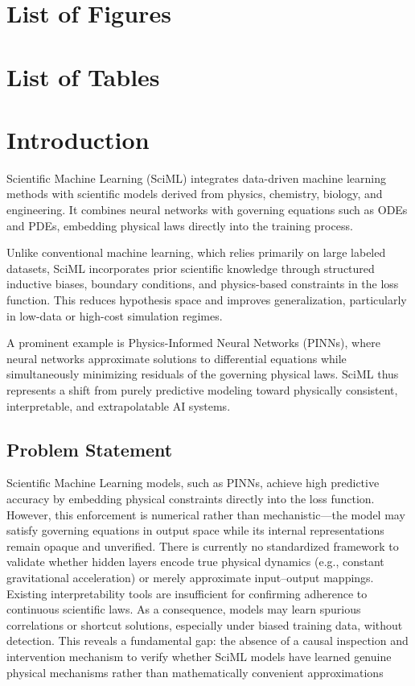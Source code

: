 \documentclass[12pt,singleside,a4paper]{article}
\begin{document}
\section*{List of Figures}
\listoffigures
\pagebreak
\section*{List of Tables}
\listoftables
\pagebreak
\tableofcontents
\pagebreak
\section{Introduction}
Scientific Machine Learning (SciML) integrates data-driven machine learning methods with scientific models derived from physics, chemistry, biology, and engineering. It combines neural networks with governing equations such as ODEs and PDEs, embedding physical laws directly into the training process.

Unlike conventional machine learning, which relies primarily on large labeled datasets, SciML incorporates prior scientific knowledge through structured inductive biases, boundary conditions, and physics-based constraints in the loss function. This reduces hypothesis space and improves generalization, particularly in low-data or high-cost simulation regimes.

A prominent example is Physics-Informed Neural Networks (PINNs), where neural networks approximate solutions to differential equations while simultaneously minimizing residuals of the governing physical laws. SciML thus represents a shift from purely predictive modeling toward physically consistent, interpretable, and extrapolatable AI systems.
\subsection{Problem Statement}
Scientific Machine Learning models, such as PINNs, achieve high predictive accuracy by embedding physical constraints directly into the loss function. However, this enforcement is numerical rather than mechanistic—the model may satisfy governing equations in output space while its internal representations remain opaque and unverified.
There is currently no standardized framework to validate whether hidden layers encode true physical dynamics (e.g., constant gravitational acceleration) or merely approximate input–output mappings. Existing interpretability tools are insufficient for confirming adherence to continuous scientific laws.
As a consequence, models may learn spurious correlations or shortcut solutions, especially under biased training data, without detection.
This reveals a fundamental gap: the absence of a causal inspection and intervention mechanism to verify whether SciML models have learned genuine physical mechanisms rather than mathematically convenient approximations
\end{document}

